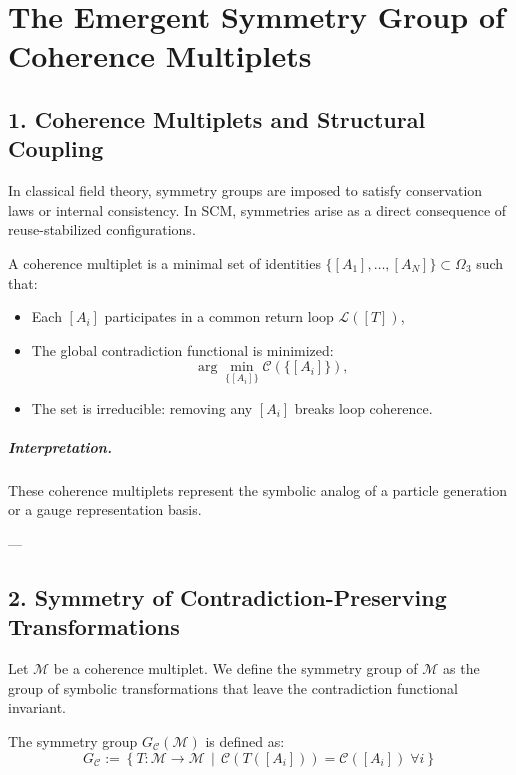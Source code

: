 \chapter{The Emergent Symmetry Group of Coherence Multiplets}
\label{chapter-emergent-symmetry}

\section{1. Coherence Multiplets and Structural Coupling}
\label{sec:coherence-multiplets}

In classical field theory, symmetry groups are imposed to satisfy conservation laws or internal consistency. In SCM, symmetries arise as a direct consequence of reuse-stabilized configurations.

\begin{definition}
A coherence multiplet is a minimal set of identities $\{[A_1], \dots, [A_N]\} \subset \Omega_3$ such that:

\begin{itemize}
  \item Each $[A_i]$ participates in a common return loop $\mathcal{L}([T])$,
  \item The global contradiction functional is minimized:
  \[
  \arg \min_{\{[A_i]\}} \mathcal{C}\left( \{[A_i]\} \right),
  \]
  \item The set is irreducible: removing any $[A_i]$ breaks loop coherence.
\end{itemize}
\end{definition}

\paragraph{Interpretation.}
These coherence multiplets represent the symbolic analog of a particle generation or a gauge representation basis.

---

\section{2. Symmetry of Contradiction-Preserving Transformations}
\label{sec:symmetry-group}

Let $\mathcal{M}$ be a coherence multiplet. We define the symmetry group of $\mathcal{M}$ as the group of symbolic transformations that leave the contradiction functional invariant.

\begin{definition}
\label{def:contradiction-symmetry}
The symmetry group $G_\mathcal{C}(\mathcal{M})$ is defined as:
\[
G_\mathcal{C} := \left\{ T : \mathcal{M} \to \mathcal{M} \,\middle|\, \mathcal{C}(T([A_i])) = \mathcal{C}([A_i]) \; \forall i \right\}
\]
\end{definition}

